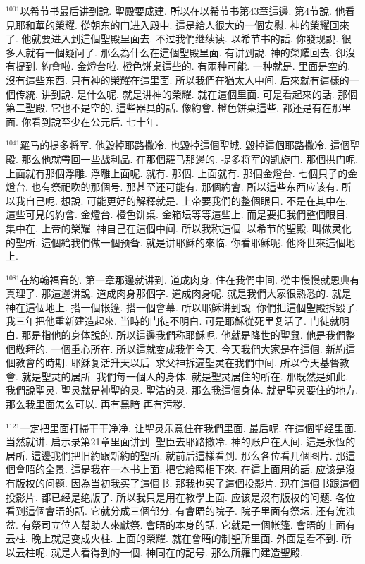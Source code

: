\documentclass{book}
\begin{document}
$^{1001}$以希节书最后讲到說.
聖殿要成建.
所以在以希节书第43章這邊.
第4节說.
他看見耶和華的榮耀.
從朝东的门进入殿中.
這是給人很大的一個安慰.
神的榮耀回來了.
他就要进入到這個聖殿里面去.
不过我們继续读.
以希节书的話.
你發现說.
很多人就有一個疑问了.
那么為什么在這個聖殿里面.
有讲到說.
神的榮耀回去.
卻沒有提到.
約會啦.
金燈台啦.
橙色饼桌這些的.
有兩种可能.
一种就是.
里面是空的.
沒有這些东西.
只有神的榮耀在這里面.
所以我們在猶太人中间.
后來就有這樣的一個传統.
讲到說.
是什么呢.
就是讲神的榮耀.
就在這個里面.
可是看起來的話.
那個第二聖殿.
它也不是空的.
這些器具的話.
像約會.
橙色饼桌這些.
都还是有在那里面.
你看到說至少在公元后.
七十年.

$^{1041}$羅马的提多将军.
他毀掉耶路撒冷.
也毀掉這個聖城.
毀掉這個耶路撒冷.
這個聖殿.
那么他就帶回一些战利品.
在那個羅马那邊的.
提多将军的凯旋门.
那個拱门呢.
上面就有那個浮雕.
浮雕上面呢.
就有.
那個.
上面就有.
那個金燈台.
七個只子的金燈台.
也有祭祀吹的那個号.
那甚至还可能有.
那個約會.
所以這些东西应该有.
所以我自己呢.
想說.
可能更好的解釋就是.
上帝要我們的整個眼目.
不是在其中在.
這些可見的約會.
金燈台.
橙色饼桌.
金箱坛等等這些上.
而是要把我們整個眼目.
集中在.
上帝的榮耀.
神自己在這個中间.
所以我称這個.
以希节的聖殿.
叫做灵化的聖所.
這個給我們做一個预备.
就是讲耶穌的來临.
你看耶穌呢.
他降世來這個地上.

$^{1081}$在約翰福音的.
第一章那邊就讲到.
道成肉身.
住在我們中间.
從中慢慢就恩典有真理了.
那這邊讲說.
道成肉身那個字.
道成肉身呢.
就是我們大家很熟悉的.
就是神在這個地上.
搭一個帐篷.
搭一個會幕.
所以耶穌讲到說.
你們把這個聖殿拆毀了.
我三年把他重新建造起來.
当時的门徒不明白.
可是耶穌從死里复活了.
门徒就明白.
那是指他的身体說的.
所以這邊我們称耶穌呢.
他就是降世的聖鼠.
他是我們整個敬拜的.
一個重心所在.
所以這就变成我們今天.
今天我們大家是在這個.
新約這個教會的時期.
耶穌复活升天以后.
求父神拆遍聖灵在我們中间.
所以今天基督教會.
就是聖灵的居所.
我們每一個人的身体.
就是聖灵居住的所在.
那既然是如此.
我們說聖灵.
聖灵就是神聖的灵.
聖洁的灵.
那么我這個身体.
就是聖灵要住的地方.
那么我里面怎么可以.
再有黑暗 再有污秽.

$^{1121}$一定把里面打掃干干净净.
让聖灵乐意住在我們里面.
最后呢.
在這個聖经里面.
当然就讲.
启示录第21章里面讲到.
聖臣去耶路撒冷.
神的账户在人间.
這是永恆的居所.
這邊我們把旧約跟新約的聖所.
就前后這樣看到.
那么各位看几個图片.
那這個會晤的全景.
這是我在一本书上面.
把它給照相下來.
在這上面用的話.
应该是沒有版权的问题.
因為当初我买了這個书.
那我也买了這個投影片.
现在這個书跟這個投影片.
都已经是绝版了.
所以我只是用在教學上面.
应该是沒有版权的问题.
各位看到這個會晤的話.
它就分成三個部分.
有會晤的院子.
院子里面有祭坛.
还有洗浊盆.
有祭司立位人幫助人來獻祭.
會晤的本身的話.
它就是一個帐篷.
會晤的上面有云柱.
晚上就是变成火柱.
上面的榮耀.
就在會晤的制聖所里面.
外面是看不到.
所以云柱呢.
就是人看得到的一個.
神同在的記号.
那么所羅门建造聖殿.
\end{document}

